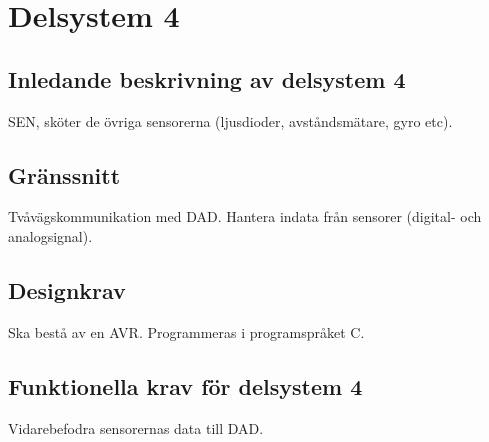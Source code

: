\section{Delsystem 4}
\subsection{Inledande beskrivning av delsystem 4}
SEN, sköter de övriga sensorerna (ljusdioder, avståndsmätare, gyro etc).

\subsection{Gränssnitt}
Tvåvägskommunikation med DAD.
Hantera indata från sensorer (digital- och analogsignal).

\subsection{Designkrav}
Ska bestå av en AVR.
Programmeras i programspråket C.

\subsection{Funktionella krav för delsystem 4}
Vidarebefodra sensorernas data till DAD. 